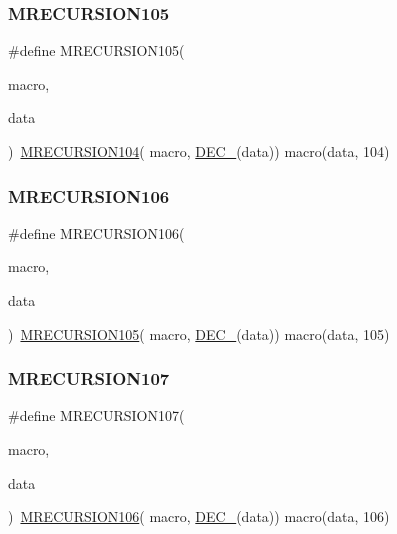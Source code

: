 \subsubsection{\texorpdfstring{MRECURSION105}{MRECURSION105}}
{\footnotesize\ttfamily \#define M\+R\+E\+C\+U\+R\+S\+I\+O\+N105(\begin{DoxyParamCaption}\item[{}]{macro,  }\item[{}]{data }\end{DoxyParamCaption})~\mbox{\hyperlink{group__group__sam0__utils__mrecursion_ga25a6fddabb19c7e2b9d332ca28726ab8}{M\+R\+E\+C\+U\+R\+S\+I\+O\+N104}}(  macro, \mbox{\hyperlink{group__group__sam0__utils__mrecursion_ga1d23d683797679dca8c3512a54a5dcae}{D\+E\+C\+\_\+}}(data))   macro(data, 104)}

\mbox{\label{group__group__sam0__utils__mrecursion_gaddf3759d5e5b4aa3627ee44ea6e71cce}} 
\subsubsection{\texorpdfstring{MRECURSION106}{MRECURSION106}}
{\footnotesize\ttfamily \#define M\+R\+E\+C\+U\+R\+S\+I\+O\+N106(\begin{DoxyParamCaption}\item[{}]{macro,  }\item[{}]{data }\end{DoxyParamCaption})~\mbox{\hyperlink{group__group__sam0__utils__mrecursion_ga80adb30156191477474dbaaea95ae1cd}{M\+R\+E\+C\+U\+R\+S\+I\+O\+N105}}(  macro, \mbox{\hyperlink{group__group__sam0__utils__mrecursion_ga1d23d683797679dca8c3512a54a5dcae}{D\+E\+C\+\_\+}}(data))   macro(data, 105)}

\mbox{\label{group__group__sam0__utils__mrecursion_ga49eb823fe885fa9aee81242dc9265a4e}} 
\subsubsection{\texorpdfstring{MRECURSION107}{MRECURSION107}}
{\footnotesize\ttfamily \#define M\+R\+E\+C\+U\+R\+S\+I\+O\+N107(\begin{DoxyParamCaption}\item[{}]{macro,  }\item[{}]{data }\end{DoxyParamCaption})~\mbox{\hyperlink{group__group__sam0__utils__mrecursion_gaddf3759d5e5b4aa3627ee44ea6e71cce}{M\+R\+E\+C\+U\+R\+S\+I\+O\+N106}}(  macro, \mbox{\hyperlink{group__group__sam0__utils__mrecursion_ga1d23d683797679dca8c3512a54a5dcae}{D\+E\+C\+\_\+}}(data))   macro(data, 106)}

